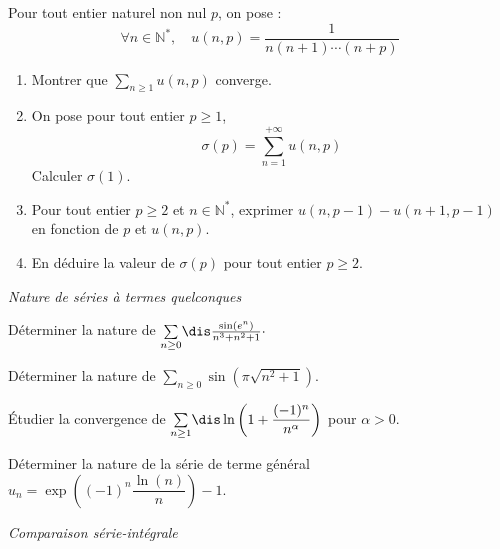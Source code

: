 \documentclass[a4paper,10pt]{report}
\newcommand{\Sum}[2]{\ensuremath{\textstyle{\sum\limits_{#1}^{#2}}}}
\begin{document}
\begin{Exa} Pour tout entier naturel non nul $p$, on pose :
$$ \forall n \in \mathbb{N}^*, \quad u(n,p) = \frac{1}{n(n+1)\cdots(n+p)}$$

\begin{enumerate}
\item Montrer que $\Sum{n \geq 1}{}  u(n,p)$ converge.
\item On pose pour tout entier $p \geq 1$,
$$ \sigma(p) = \sum_{n=1}^{+ \infty} u(n,p)$$
Calculer $\sigma(1)$.
\item Pour tout entier $p \geq 2$ et $n \in \mathbb{N}^*$, exprimer $u(n,p-1)-u(n+1,p-1)$ en fonction de $p$ et $u(n,p)$.
\item En déduire la valeur de $\sigma(p)$ pour tout entier $p \geq 2$.
\end{enumerate}
\end{Exa}




\medskip

\begin{center}
\textit{{ {\large Nature de séries à termes quelconques}}}
\end{center}

\medskip

\begin{Exa} Déterminer la nature de $\Sum{n \geq 0}{} \dis\frac{\sin(e^n)}{n^3+n^2+1} \cdot$
\end{Exa}

\begin{Exa}[\ding{80}] Déterminer la nature de $\Sum{n \geq 0}{} \sin \left({\pi \sqrt {n^2 + 1}} \right)$.
\end{Exa}



\begin{Exa} Étudier la convergence de $\Sum{n \geq 1}{} \dis \ln \left( 1 + \dfrac{(-1)^n}{n^{\alpha}} \right)$ pour $\alpha>0$.
\end{Exa} 


\begin{Exa} Déterminer la nature de la série de terme général $u_n = \exp \left( (-1)^n \dfrac{\ln(n)}{n} \right)-1$.
\end{Exa}


\medskip

\begin{center}
\textit{{ {\large Comparaison série-intégrale}}}
\end{center}

\medskip
\end{document}
